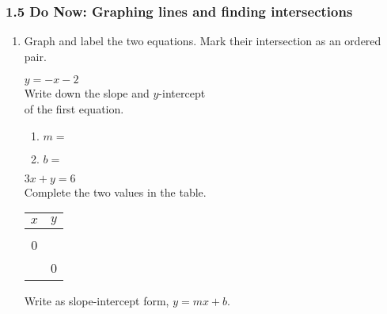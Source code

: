 \documentclass[12pt, twoside]{article}
\begin{document}
\subsubsection*{1.5 Do Now: Graphing lines and finding intersections}
\begin{enumerate}
  \item Graph and label the two equations. Mark their intersection as an ordered pair.

  \begin{multicols}{2}
    $y = -x-2$ \\[0.5cm]
    Write down the slope and $y$-intercept\\ of the first equation.
    \begin{enumerate}
      \item $m=$ \bigskip
      \item $b=$
    \end{enumerate} \vspace{1cm}

    $3x+y = 6$ \\
    Complete the two values in the table.
      \begin{flushleft}
      \begin{tabular}{c|c}
            $x$ & $y$ \\
            \hline \\
             0 & \underline{\hspace{1cm}} \\[5pt]
             \underline{\hspace{1cm}}  & 0 \\
          \end{tabular}
        \end{flushleft}
        Write as slope-intercept form, $y=mx+b$.
    \end{multicols} \vspace{1cm}

  \begin{center} %
  \end{center}


\end{enumerate}
\end{document}

